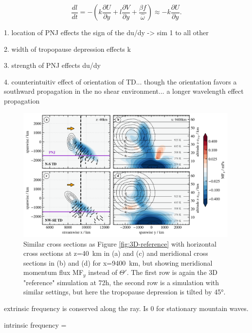 \begin{equation}
    \frac{dl}{dt} = -(k \frac{\partial U}{\partial y} + l \frac{\partial V}{\partial y} + \frac{\beta f}{\hat{\omega}})
    \approx -k \frac{\partial U}{\partial y}.
    \label{equ:meridionalRefraction2}
\end{equation}

1. location of PNJ effects the sign of the du/dy -> sim 1 to all other

2. width of tropopause depression effects k

3. strength of PNJ effects du/dy

4. counterintuitiv effect of orientation of TD... though the orientation favors a southward propagation in the no shear environment... a longer wavelength    effect propagation

\begin{figure}[tbp]
    \centering
    \includegraphics[width=0.99\textwidth]{figures_3D/3D-EF-MF.png}
    \caption{Similar cross sections as Figure \ref{fig:3D-reference} with horizontal cross sections at z=\SI{40}{\kilo\meter} in (a) and (c) and meridional cross sections in (b) and (d) for x=\SI{9400}{\kilo\meter}, but showing meridional momentum flux MF$_y$ instead of $\Theta'$. The first row is again the 3D "reference" simulation at 72h, the second row is a simulation with similar settings, but here the tropopause depression is tilted by 45°.}
    \label{fig:3D-MFy}
\end{figure}




extrinsic frequency is conserved along the ray. Is 0 for stationary mountain waves.

intrinsic frequency = 

